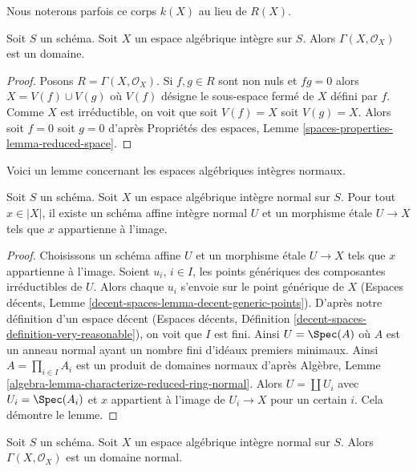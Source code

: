 \noindent
Nous noterons parfois ce corps $k(X)$ au lieu de $R(X)$.

\begin{lemma}
\label{lemma-integral-sections}
Soit $S$ un schéma. Soit $X$ un espace algébrique intègre sur $S$.
Alors $\Gamma(X, \mathcal{O}_X)$ est un domaine.
\end{lemma}

\begin{proof}
Posons $R = \Gamma(X, \mathcal{O}_X)$. Si $f, g \in R$ sont non nuls et
$fg = 0$ alors $X = V(f) \cup V(g)$ où $V(f)$ désigne le sous-espace fermé
de $X$ défini par $f$. Comme $X$ est irréductible, on voit que soit
$V(f) = X$ soit $V(g) = X$. Alors soit $f = 0$ soit $g = 0$ d'après
Propriétés des espaces, Lemme \ref{spaces-properties-lemma-reduced-space}.
\end{proof}

\noindent
Voici un lemme concernant les espaces algébriques intègres normaux.

\begin{lemma}
\label{lemma-normal-integral-cover-by-affines}
Soit $S$ un schéma. Soit $X$ un espace algébrique intègre normal sur $S$.
Pour tout $x \in |X|$, il existe un schéma affine intègre normal $U$
et un morphisme \'etale $U \to X$ tels que $x$ appartienne à l'image.
\end{lemma}

\begin{proof}
Choisissons un schéma affine $U$ et un morphisme \'etale $U \to X$ tels que
$x$ appartienne à l'image. Soient $u_i$, $i \in I$, les points génériques des
composantes irréductibles de $U$. Alors chaque $u_i$ s'envoie sur le point générique de $X$
(Espaces décents, Lemme \ref{decent-spaces-lemma-decent-generic-points}). D'après 
notre définition d'un espace décent
(Espaces décents, Définition \ref{decent-spaces-definition-very-reasonable}),
on voit que $I$ est fini. Ainsi $U = \Spec(A)$ où $A$ est un anneau normal
ayant un nombre fini d'idéaux premiers minimaux.
Ainsi $A = \prod_{i \in I} A_i$ est un produit de domaines normaux d'après
Algèbre, Lemme \ref{algebra-lemma-characterize-reduced-ring-normal}.
Alors $U = \coprod U_i$ avec $U_i = \Spec(A_i)$ et $x$ appartient à l'image de
$U_i \to X$ pour un certain $i$. Cela démontre le lemme.
\end{proof}

\begin{lemma}
\label{lemma-normal-integral-sections}
Soit $S$ un schéma. Soit $X$ un espace algébrique intègre normal sur $S$.
Alors $\Gamma(X, \mathcal{O}_X)$ est un domaine normal.
\end{lemma}

